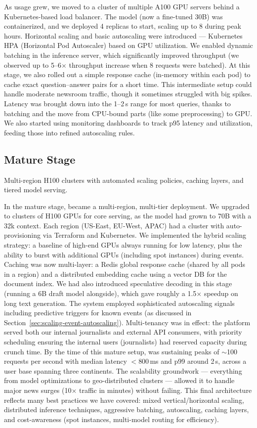 As usage grew, we moved to a cluster of multiple A100 GPU servers behind a Kubernetes-based load balancer. The model (now a fine-tuned 30B) was containerized, and we deployed 4 replicas to start, scaling up to 8 during peak hours. Horizontal scaling and basic autoscaling were introduced --- Kubernetes HPA (Horizontal Pod Autoscaler) based on GPU utilization. We enabled dynamic batching in the inference server, which significantly improved throughput (we observed up to 5--6$\times$ throughput increase when 8 requests were batched). At this stage, we also rolled out a simple response cache (in-memory within each pod) to cache exact question--answer pairs for a short time. This intermediate setup could handle moderate newsroom traffic, though it sometimes struggled with big spikes. Latency was brought down into the 1--2\,s range for most queries, thanks to batching and the move from CPU-bound parts (like some preprocessing) to GPU. We also started using monitoring dashboards to track p95 latency and utilization, feeding those into refined autoscaling rules.

\subsection{Mature Stage}
\label{sec:scaling-ishtar-mature}
Multi-region H100 clusters with automated scaling policies, caching layers, and tiered model serving.

In the mature stage, \ishtar{} became a multi-region, multi-tier deployment. We upgraded to clusters of H100 GPUs for core serving, as the model had grown to 70B with a 32k context. Each region (US-East, EU-West, APAC) had a cluster with auto-provisioning via Terraform and Kubernetes. We implemented the hybrid scaling strategy: a baseline of high-end GPUs always running for low latency, plus the ability to burst with additional GPUs (including spot instances) during events. Caching was now multi-layer: a Redis global response cache (shared by all pods in a region) and a distributed embedding cache using a vector DB for the document index. We had also introduced speculative decoding in this stage (running a 6B draft model alongside), which gave roughly a 1.5$\times$ speedup on long text generation. The system employed sophisticated autoscaling signals including predictive triggers for known events (as discussed in Section~\ref{sec:scaling-event-autoscaling}). Multi-tenancy was in effect: the platform served both our internal journalists and external API consumers, with priority scheduling ensuring the internal users (journalists) had reserved capacity during crunch time. By the time of this mature setup, \ishtar{} was sustaining peaks of $\sim$100 requests per second with median latency $<\!800$\,ms and p99 around 2\,s, across a user base spanning three continents. The scalability groundwork --- everything from model optimizations to geo-distributed clusters --- allowed it to handle major news surges (10$\times$ traffic in minutes) without failing. This final architecture reflects many best practices we have covered: mixed vertical/horizontal scaling, distributed inference techniques, aggressive batching, autoscaling, caching layers, and cost-awareness (spot instances, multi-model routing for efficiency).


